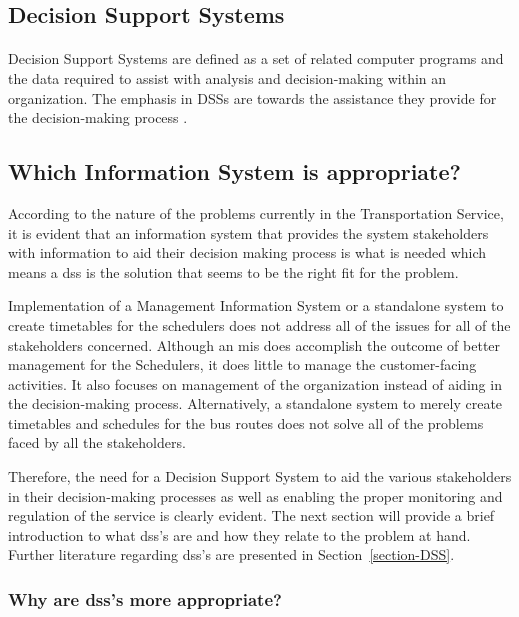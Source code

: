 \subsection{Decision Support Systems}
\label{section-DSSIntro}

\paragraph{} Decision Support Systems are defined as a set of related computer programs and the data required to assist with analysis and decision-making within an organization. The emphasis in DSSs are towards the assistance they provide for the decision-making process \cite{Turban2005}.

\subsection{Which Information System is appropriate?}

According to the nature of the problems currently in the Transportation Service, it is evident that an information system that provides the system stakeholders with information to aid their decision making process is what is needed which means a \acrshort{dss} is the solution that seems to be the right fit for the problem.

Implementation of a Management Information System or a standalone system to create timetables for the schedulers does not address all of the issues for all of the stakeholders concerned. Although an \acrshort{mis} does accomplish the outcome of better management for the Schedulers, it does little to manage the customer-facing activities. It also focuses on management of the organization instead of aiding in the decision-making process. Alternatively, a standalone system to merely create timetables and schedules for the bus routes does not solve all of the problems faced by all the stakeholders. 

Therefore, the need for a Decision Support System to aid the various stakeholders in their decision-making processes as well as enabling the proper monitoring and regulation of the service is clearly evident. The next section will provide a brief introduction to what \acrshort{dss}'s are and how they relate to the problem at hand.  Further literature regarding \acrshort{dss}'s are presented in Section~\ref{section-DSS}.

\subsubsection {Why are \acrshort{dss}'s more appropriate?}

